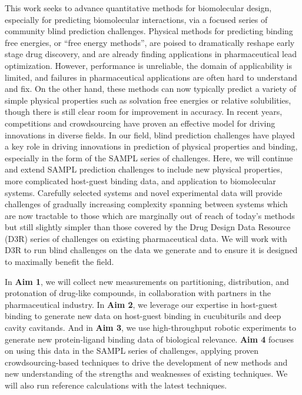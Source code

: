 \documentclass[11pt]{article}
\begin{document}
This work seeks to advance quantitative methods for biomolecular design, especially for predicting biomolecular interactions, via a focused series of community blind prediction challenges. 
Physical methods for predicting binding free energies, or ``free energy methods'', are poised to dramatically reshape early stage drug discovery, and are already finding applications in pharmaceutical lead optimization. 
However, performance is unreliable, the domain of applicability is limited, and failures in pharmaceutical applications are often hard to understand and fix.
On the other hand, these methods can now typically predict a variety of simple physical properties such as solvation free energies or relative solubilities, though there is still clear room for improvement in accuracy.
In recent years, competitions and crowdsourcing have proven an effective model for driving innovations in diverse fields.
In our field, blind prediction challenges have played a key role in driving innovations in prediction of physical properties and binding, especially in the form of the SAMPL series of challenges. 
Here, we will continue and extend SAMPL prediction challenges to include new physical properties, more complicated host-guest binding data, and application to biomolecular systems.
Carefully selected systems and novel experimental data will provide challenges of gradually increasing complexity spanning between systems which are now tractable to those which are marginally out of reach of today's methods but still slightly simpler than those covered by the Drug Design Data Resource (D3R) series of challenges on existing pharmaceutical data. 
We will work with D3R to run blind challenges on the data we generate and to ensure it is designed to maximally benefit the field.

In {\bf Aim 1}, we will collect new measurements on partitioning, distribution, and protonation of drug-like compounds, in collaboration with partners in the pharmaceutical industry. In {\bf Aim 2}, we leverage our expertise in host-guest binding to generate new data on host-guest binding in cucubiturils and deep cavity cavitands. And in {\bf Aim 3}, we use high-throughput robotic experiments to generate new protein-ligand binding data of biological relevance. {\bf Aim 4} focuses on using this data in the SAMPL series of challenges, applying proven crowdsourcing-based techniques to drive the development of new methods and new understanding of the strengths and weaknesses of existing techniques. We will also run reference calculations with the latest techniques.
\end{document}
